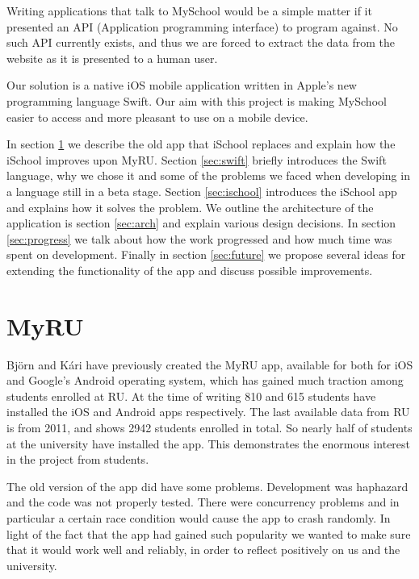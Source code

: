\documentclass[pdftex, DIV=calc, paper=a4, fontsize=11pt]{scrartcl}	 %
\begin{document}
Writing applications that talk to MySchool would be a simple matter if it presented an API
(Application programming interface) to program against. No such API currently exists, and thus
we are forced to extract the data from the website as it is presented to a human user.

Our solution is a native iOS\cite{ios} mobile application written in Apple's new programming language Swift\cite{swift}.
Our aim with this project is making MySchool easier to access and more pleasant to use on a mobile
device.

In section \ref{sec:myru} we describe the old app that iSchool replaces and explain how the iSchool
improves upon MyRU. Section \ref{sec:swift} briefly introduces the Swift language, why we chose it
and some of the problems we faced when developing in a language still in a beta stage. Section
\ref{sec:ischool} introduces the iSchool app and explains how it solves the problem. We outline
the architecture of the application is section \ref{sec:arch} and explain various design decisions.
In section \ref{sec:progress} we talk about how the work progressed and how much time was spent on
development. Finally in section \ref{sec:future} we propose several ideas for extending the
functionality of the app and discuss possible improvements.

\section{MyRU}
\label{sec:myru}

Björn and Kári have previously created the MyRU app, available for both for iOS and Google's Android
operating system\cite{android}, which has gained much traction among students enrolled at RU. At the time of writing 810 
and 615 students have installed the iOS and Android apps respectively. The last available data 
from RU is from 2011, and shows 2942 students enrolled in total. So nearly half of students at the 
university have installed the app. This demonstrates the enormous interest in the project from
students.

The old version of the app did have some problems. Development was haphazard and the code was not
properly tested. There were concurrency problems and in particular a certain race condition would
cause the app to crash randomly. In light of the fact that the app had gained such popularity we 
wanted to make sure that it would work well and reliably, in order to reflect positively on us and
the university.
\end{document}
